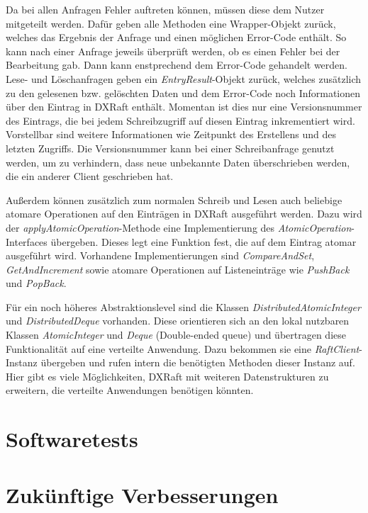 Da bei allen Anfragen Fehler auftreten können, müssen diese dem Nutzer mitgeteilt werden. Dafür geben alle Methoden eine Wrapper-Objekt zurück, welches das Ergebnis der Anfrage und einen möglichen Error-Code enthält. So kann nach einer Anfrage jeweils überprüft werden, ob es einen Fehler bei der Bearbeitung gab. Dann kann enstprechend dem Error-Code gehandelt werden. Lese- und Löschanfragen geben ein \textit{EntryResult}-Objekt zurück, welches zusätzlich zu den gelesenen bzw. gelöschten Daten und dem Error-Code noch Informationen über den Eintrag in DXRaft enthält. Momentan ist dies nur eine Versionsnummer des Eintrags, die bei jedem Schreibzugriff auf diesen Eintrag inkrementiert wird. Vorstellbar sind weitere Informationen wie Zeitpunkt des Erstellens und des letzten Zugriffs. Die Versionsnummer kann bei einer Schreibanfrage genutzt werden, um zu verhindern, dass neue unbekannte Daten überschrieben werden, die ein anderer Client geschrieben hat.

Außerdem können zusätzlich zum normalen Schreib und Lesen auch beliebige atomare Operationen auf den Einträgen in DXRaft ausgeführt werden. Dazu wird der \textit{applyAtomicOperation}-Methode eine Implementierung des \textit{AtomicOperation}-Interfaces übergeben. Dieses legt eine Funktion fest, die auf dem Eintrag atomar ausgeführt wird. Vorhandene Implementierungen sind \textit{CompareAndSet}, \textit{GetAndIncrement} sowie atomare Operationen auf Listeneinträge wie \textit{PushBack} und \textit{PopBack}.

Für ein noch höheres Abstraktionslevel sind die Klassen \textit{DistributedAtomicInteger} und \textit{DistributedDeque} vorhanden. Diese orientieren sich an den lokal nutzbaren Klassen \textit{AtomicInteger} und \textit{Deque} (Double-ended queue) und übertragen diese Funktionalität auf eine verteilte Anwendung. Dazu bekommen sie eine \textit{RaftClient}-Instanz übergeben und rufen intern die benötigten Methoden dieser Instanz auf. Hier gibt es viele Möglichkeiten, DXRaft mit weiteren Datenstrukturen zu erweitern, die verteilte Anwendungen benötigen könnten.

\section{Softwaretests}

\section{Zukünftige Verbesserungen}
